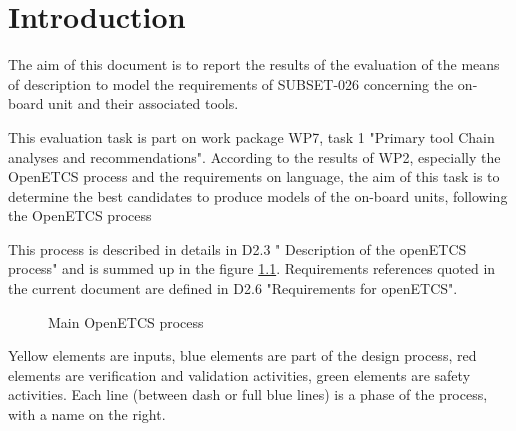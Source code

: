 

\chapter{Introduction}
\label{sec:intro}


The aim of this document is to report the results of the evaluation of the means of description to model the requirements of SUBSET-026 concerning the on-board unit and their associated tools.

This evaluation task is part on work package WP7, task 1  "Primary tool Chain analyses and recommendations". According to the results of WP2, especially the OpenETCS process and the requirements on language, the aim of this task is to determine the best candidates to  produce models of the on-board units, following the OpenETCS process

This process is described in details in D2.3 " Description of the openETCS process" and is summed up in the figure \ref{fig:main_process}. Requirements references quoted in the current document are defined in D2.6 "Requirements for openETCS".
 

 \begin{figure}
  \centering
  \caption{Main OpenETCS process}
  \label{fig:main_process}
\end{figure}

Yellow elements are inputs, blue elements are part of the design process, red elements are verification and validation activities, green elements are safety activities. Each line (between dash or full blue lines) is a phase of the process, with a name on the right. 

